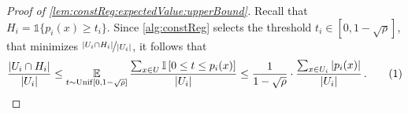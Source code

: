 \documentclass[11pt]{article}
\theoremstyle{plain}
\theoremstyle{definition}
\theoremstyle{remark}
\newcommand{\yesnum}{\addtocounter{equation}{1}\tag{\theequation}}
\def\abs#1{\left| #1 \right|}
\newcommand{\sinbrace}[1]{\{#1\}}
\newcommand{\insquare}[1]{\left[#1\right]}
\newcommand{\E}{\operatornamewithlimits{\mathbb{E}}}
\newcommand{\Ex}{\E}
\newcommand{\nfrac}[2]{\nicefrac{#1}{#2}}
\begin{document}
        
        \begin{proof}[Proof of \cref{lem:constReg:expectedValue:upperBound}]
            Recall that $H_i=\mathds{1}\sinbrace{p_i(x)\geq t_i}$.
            Since \cref{alg:constReg} selects the threshold $t_i\in [0, 1-\sqrt{\rho}]$, that minimizes $\nfrac{\abs{U_i\cap H_i}}{\abs{U_i}}$, it follows that 
            \[
                \frac{\abs{U_i\cap H_i}}{\abs{U_i}}
                \leq \Ex_{t\sim {\rm Unif}[0, 1-\sqrt{\rho}]} 
                \frac{
                    \sum_{x\in U} \mathbb{I}\insquare{0\leq t\leq p_i(x)}
                }{\abs{U_i}}
                \leq  \frac{1}{{1 - \sqrt{\rho}}}\cdot 
                \frac{
                    \sum_{x\in U_i} \abs{p_i(x)}
                }{\abs{U_i}}
                \,.
                \yesnum\label{eq:constRegAnalysis1}
            \]
        \end{proof}
\end{document}
